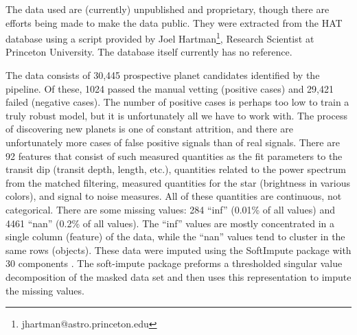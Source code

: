 The data used are (currently) unpublished and proprietary, though there are efforts being made to make the data public.  They were extracted from the HAT database using a script provided by Joel Hartman\footnote{jhartman@astro.princeton.edu}, Research Scientist at Princeton University.  The database itself currently has no reference.

The data consists of 30,445 prospective planet candidates identified by the pipeline.  Of these, 1024 passed the manual vetting (positive cases) and 29,421 failed (negative cases).  The number of positive cases is perhaps too low to train a truly robust model, but it is unfortunately all we have to work with.  The process of discovering new planets is one of constant attrition, and there are unfortunately more cases of false positive signals than of real signals.  There are 92 features that consist of such measured quantities as the fit parameters to the transit dip (transit depth, length, etc.), quantities related to the power spectrum from the matched filtering, measured quantities for the star (brightness in various colors), and signal to noise measures.  All of these quantities are  continuous, not categorical.  There are some missing values: 284 ``inf'' (0.01\% of all values) and 4461 ``nan'' (0.2\% of all values).  The ``inf'' values are mostly concentrated in a single column (feature) of the data, while the ``nan'' values tend to cluster in the same rows (objects).  These data were imputed using the SoftImpute package with 30 components \cite{SoftImpute}. The soft-impute package preforms a thresholded singular value decomposition of the masked data set and then uses this representation to impute the missing values.